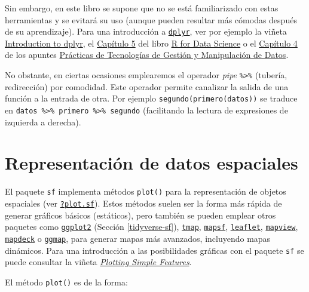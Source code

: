 \documentclass[
  spanish,
]{book}
\theoremstyle{break}
\theoremstyle{definition}
\theoremstyle{definition}
\theoremstyle{definition}
\theoremstyle{definition}
\theoremstyle{remark}
\begin{document}
Sin embargo, en este libro se supone que no se está familiarizado con estas herramientas y se evitará su uso (aunque pueden resultar más cómodas después de su aprendizaje).
Para una introducción a \href{https://dplyr.tidyverse.org}{\texttt{dplyr}}, ver por ejemplo la viñeta \href{https://cran.rstudio.com/web/packages/dplyr/vignettes/dplyr.html}{Introduction to dplyr},
el \href{http://r4ds.had.co.nz/transform.html}{Capítulo 5} del libro \href{http://r4ds.had.co.nz}{R for Data Science} o el \href{https://gltaboada.github.io/tgdbook/dplyr.html}{Capítulo 4} de los apuntes \href{https://gltaboada.github.io/tgdbook}{Prácticas de Tecnologías de Gestión y Manipulación de Datos}.

No obstante, en ciertas ocasiones emplearemos el operador \emph{pipe} \texttt{\%\textgreater{}\%} (tubería, redirección) por comodidad.
Este operador permite canalizar la salida de una función a la entrada de otra.
Por ejemplo \texttt{segundo(primero(datos))} se traduce en \texttt{datos\ \%\textgreater{}\%\ primero\ \%\textgreater{}\%\ segundo}
(facilitando la lectura de expresiones de izquierda a derecha).

\hypertarget{representaciuxf3n-de-datos-espaciales}{%
\section{Representación de datos espaciales}\label{representaciuxf3n-de-datos-espaciales}}

El paquete \texttt{sf} implementa métodos \texttt{plot()} para la representación de objetos espaciales (ver \href{https://r-spatial.github.io/sf/reference/plot.html}{\texttt{?plot.sf}}).
Estos métodos suelen ser la forma más rápida de generar gráficos básicos (estáticos), pero también se pueden emplear otros paquetes como \href{https://ggplot2.tidyverse.org}{\texttt{ggplot2}} (Sección \ref{tidyverse-sf}), \href{https://r-tmap.github.io/tmap}{\texttt{tmap}}, \href{https://riatelab.github.io/mapsf}{\texttt{mapsf}}, \href{https://rstudio.github.io/leaflet}{\texttt{leaflet}}, \href{https://r-spatial.github.io/mapview}{\texttt{mapview}}, \href{https://symbolixau.github.io/mapdeck}{\texttt{mapdeck}} o \href{https://github.com/dkahle/ggmap}{\texttt{ggmap}}, para generar mapas más avanzados, incluyendo mapas dinámicos.
Para una introducción a las posibilidades gráficas con el paquete \texttt{sf} se puede consultar la viñeta \href{https://r-spatial.github.io/sf/articles/sf5.html}{\emph{Plotting Simple Features}}.

El método \texttt{plot()} es de la forma:
\end{document}
